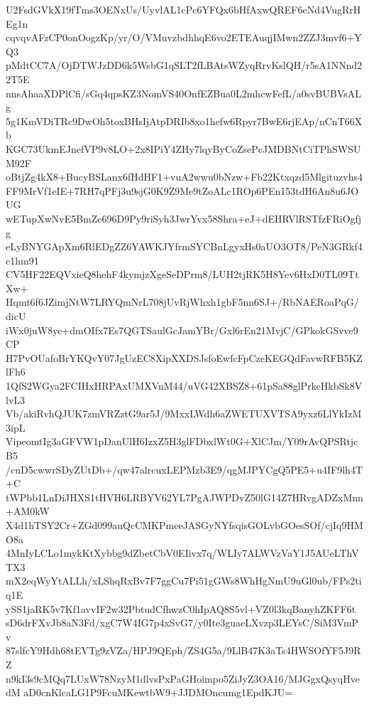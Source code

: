 U2FsdGVkX19fTms3OENxUs/UyvlAL1cPc6YFQx6bHfAxwQREF6eNd4VugRrHEg1n
cqvqvAFzCP0onOogzKp/yr/O/VMuvzbdhhqE6vo2ETEAuqjIMwn2ZZJ3mvf6+YQ3
pMdtCC7A/OjDTWJzDD6k5WsbG1qSLT2fLBAtsWZyqRrvKslQH/r5sA1NNnd22T5E
nnsAhaaXDPlCfi/sGq4qpsKZ3NomVS40OnfEZBua0L2mhcwFefL/a0svBUBVsALg
5g1KmVDiTRc9DwOh5toxBHsIjAtpDRIb8xo1hefw6Rpyr7BwE6rjEAp/nCnT66Xb
KGC73UkmEJnefVP9v8LO+2x8IPiY4ZHy7lqyByCoZsePcJMDBNtCiTPhSWSUM92F
oBtjZg4kX8+BucyBSLanx6fHdHF1+vuA2wwu0bNzw+Fb22Ktxqzd5Mlgituzvhs4
FF9MrVf1eIE+7RH7qPFj3u9sjG0K9Z9Me9tZoALc1ROp6PEn153tdH6An8u6JOUG
wETupXwNvE5BmZe696D9Py9riSyh3JwrYvx58Shra+eJ+dEHRVlRSTfzFRiOgfjg
eLyBNYGApXm6RlEDgZZ6YAWKJYfrmSYCBnLgyxHs0aUO3OT8/PeN3GRkf4c1hm91
CV5HF22EQVxieQ8hehF4kymjzXgeSeDPrm8/LUH2tjRK5H8Yev6HxD0TL09TtXw+
Hqmt6f6JZimjNtW7LRYQmNrL708jUvRjWhxh1gbF5nn6SJ+/RbNAERoaPqG/dicU
iWx0juW8ye+dmOIfx7Es7QGTSaulGcJamYBr/Gxl6rEn21MvjC/GPkokGSvve9CP
H7PvOUafoBrYKQvY07JgUzEC8XipXXDSJsfoEwfcFpCzeKEGQdFavwRFB5KZlFh6
1QfS2WGya2FCIHxHRPAxUMXVnM44/uVG42XBSZ8+61pSa88glPrkcHkbSk8VlvL3
Vb/akiRvhQJUK7zmVRZztG9ar5J/9MxxLWdh6aZWETUXVTSA9yxz6LlYkIzM3ipL
VipeomtIg3aGFVW1pDanUlH6IzxZ5H3glFDbxlWt0G+XlCJm/Y09rAvQPSRtjcB5
/cuD5cwwrSDyZUtDb+/qw47alrcuxLEPMzb3E9/qgMJPYCgQ5PE5+u4IF9lh4T+C
tWPbb1LnDiJHXS1tHVH6LRBYV62YL7PgAJWPDvZ50lG14Z7HRvgADZxMnn+AM0kW
X4d1hTSY2Cr+ZGd099auQcCMKPmeeJASGyNYfsqisGOLvbGOesSOf/cjIq9HMO8a
4MnIyLCLo1mykKtXybbg9dZbetCbV0EIivx7q/WLIy7ALWVzVaY1J5AUeLThVTX3
mX2eqWyYtALLh/xLShqRxBv7F7ggCu7Pi51gGWs8WhHgNmU9uGl0ub/FPs2tiq1E
ySS1jaRK5v7Kf1avvIF2w32PbtudCfhwzC0hIpAQ8S5vl+VZ0l3kqBanyhZKFF6t
sD6drFXvJb8aN3Fd/xgC7W4IG7p4xSvG7/y0Ite3guaeLXvzp3LEYsC/SiM3VmPv
87slfcY9Hdh68tEVTg9zVZa/HPJ9QEph/ZS4G5a/9LlB47K3aTs4HWSOfYF5J9RZ
n9kI3s9cMQq7LUxW78NzyM1dlvsPxPaGHoimpo5ZiJyZ3OA16/MJGgxQsyqHvedM
aD0cnKlcaLG1P9FcuMKewtbW9+JJDMOncumg1EpdKJU=
